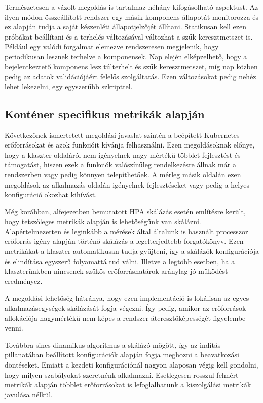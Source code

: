 Természetesen a vázolt megoldás is tartalmaz néhány kifogásolható aspektust. 
Az ilyen módon összeállított rendszer egy másik komponens állapotát monitorozza és ez alapján tudja a saját készenléti állapotjelzőjét állítani. 
Statikusan kell ezen próbákat beállítani és a terhelés változásával változhat a szűk keresztmetszet is.
Például egy valódi forgalmat elemezve rendszeresen megjelenik, hogy periodikusan lesznek terhelve a komponensek.
Nap elején elképzelhető, hogy a bejelentkeztető komponens lesz túlterhelt és szűk keresztmetszet, míg nap közben pedig az adatok validációjáért felelős szolgáltatás.
Ezen változásokat pedig nehéz lehet lekezelni, egy egyszerűbb szkripttel.


\subsection{Konténer specifikus metrikák alapján}
\label{subsec:container_metric_scaling}
Következőnek ismertetett megoldási javaslat szintén a beépített Kubernetes erőforrásokat és azok funkcióit kívánja felhasználni.
Ezen megoldásoknak előnye, hogy a klaszter oldaláról nem igényelnek nagy mértékű többlet fejlesztést és támogatást, hiszen ezek a funkciók valószínűleg rendelkezésre állnak már a rendszerben vagy pedig könnyen telepíthetőek.
A mérleg másik oldalán ezen megoldások az alkalmazás oldalán igényelnek fejlesztéseket vagy pedig a helyes konfiguráció okozhat kihívást.

Még korábban,  alfejezetben bemutatott HPA skálázás esetén említésre került, hogy tetszőleges metrikák alapján is lehetőségünk van skálázni.
Alapértelmezetten és leginkább a mérések által általunk is használt processzor erőforrás igény alapján történő skálázás a legelterjedtebb forgatókönyv.
Ezen metrikákat a klaszter automatikusan tudja gyűjteni, így a skálázók konfigurációja és elindítása egyszerű folyamattá tud válni.
Illetve a legtöbb esetben, ha a klaszterünkben nincsenek szűkös erőforráshatárok aránylag jó működést eredményez.

A megoldási lehetőség hátránya, hogy ezen implementáció is lokálisan az egyes alkalmazásegységek skálázását fogja végezni.
Így pedig, amikor az erőforrások allokációja nagymértékű nem képes a rendszer áteresztőképességét figyelembe venni.

Továbbra sincs dinamikus algoritmus a skálázó mögött, így az indítás pillanatában beállított konfigurációk alapján fogja meghozni a beavatkozási döntéseket.
Emiatt a kezdeti konfigurációnál nagyon alaposan végig kell gondolni, hogy milyen szabályokat szeretnénk alkalmazni.
Esetlegesen rosszul felmért metrikák alapján többlet erőforrásokat is lefoglalhatunk a kiszolgálási metrikák javulása nélkül.

